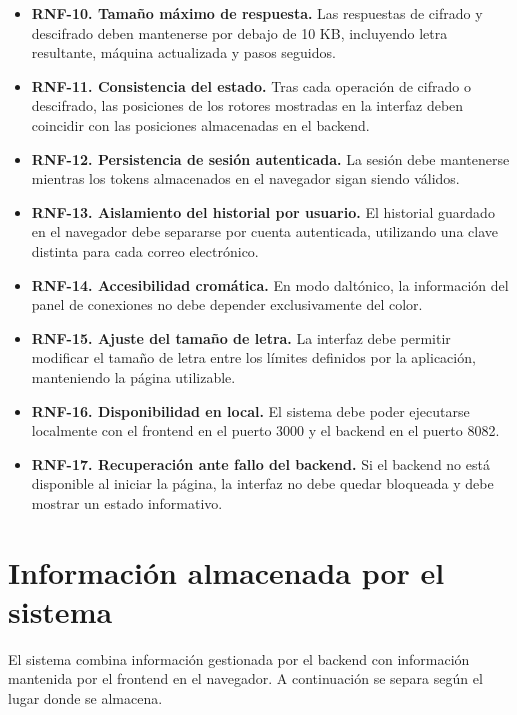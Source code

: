\begin{itemize}
	\item \textbf{RNF-10. Tamaño máximo de respuesta.} Las respuestas de cifrado y descifrado deben mantenerse por debajo de 10 KB, incluyendo letra resultante, máquina actualizada y pasos seguidos.
	
	\item \textbf{RNF-11. Consistencia del estado.} Tras cada operación de cifrado o descifrado, las posiciones de los rotores mostradas en la interfaz deben coincidir con las posiciones almacenadas en el backend.
	
	\item \textbf{RNF-12. Persistencia de sesión autenticada.} La sesión debe mantenerse mientras los tokens almacenados en el navegador sigan siendo válidos.
	
	\item \textbf{RNF-13. Aislamiento del historial por usuario.} El historial guardado en el navegador debe separarse por cuenta autenticada, utilizando una clave distinta para cada correo electrónico.
	
	\item \textbf{RNF-14. Accesibilidad cromática.} En modo daltónico, la información del panel de conexiones no debe depender exclusivamente del color.
	
	\item \textbf{RNF-15. Ajuste del tamaño de letra.} La interfaz debe permitir modificar el tamaño de letra entre los límites definidos por la aplicación, manteniendo la página utilizable.
	
	\item \textbf{RNF-16. Disponibilidad en local.} El sistema debe poder ejecutarse localmente con el frontend en el puerto 3000 y el backend en el puerto 8082.
	
	\item \textbf{RNF-17. Recuperación ante fallo del backend.} Si el backend no está disponible al iniciar la página, la interfaz no debe quedar bloqueada y debe mostrar un estado informativo.
\end{itemize}

\section{Información almacenada por el sistema}

El sistema combina información gestionada por el backend con información mantenida por el frontend en el navegador. A continuación se separa según el lugar donde se almacena.


